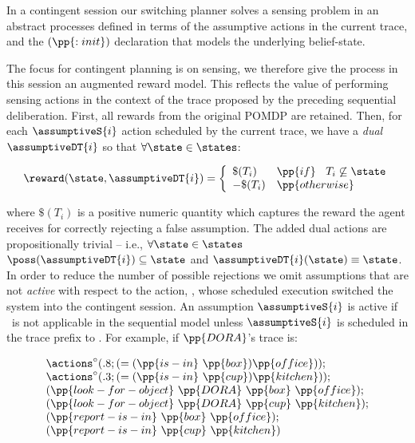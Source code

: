 In a contingent session our switching planner solves a sensing problem
in an abstract processes defined in terms of the assumptive actions in
the current trace, and the $(\pp{:init})$ declaration that models the
underlying belief-state.

The focus for contingent planning is on sensing, we therefore give the
process in this session an augmented reward model.  This reflects the
value of performing sensing actions in the context of the trace
proposed by the preceding sequential deliberation. First, all rewards
from the original POMDP are retained. Then, for each $\assumptiveS{i}$
action scheduled by the current trace, we have a {\em dual}
$\assumptiveDT{i}$ so that $\forall\state\in\states$:

\[
\reward(\state, \assumptiveDT{i}) = \bigg\{ \begin{array}{ll}
\$(T_i) & \pp{if}~\;\;T_i \not\subseteq \state \\
-\$(T_i) & \pp{otherwise} \\
\end{array}
\]

\noindent where $\$(T_i)$ is a positive numeric quantity which
captures the reward the agent receives for correctly rejecting a
false assumption. The added dual actions are propositionally trivial
-- i.e., $\forall\state\in\states$ $\poss(\assumptiveDT{i})
\subseteq \state$ and $\assumptiveDT{i}(\state) \equiv \state$.  
In order to reduce the number of possible rejections we omit
assumptions that are not {\em active} with respect to the action,
\switchAction, whose scheduled execution switched the system into
the contingent session. An assumption $\assumptiveS{i}$ is active if
\switchAction\ is not applicable in the sequential model unless
$\assumptiveS{i}$ is scheduled in the trace prefix
to \switchAction. For example, if $\pp{DORA}$'s trace is:

\[
\begin{array}{l}
\actions^{\circ}(.8;(=(\pp{is-in}~\pp{box})\pp{office}));\\
\actions^{\circ}(.3;(=(\pp{is-in}~\pp{cup})\pp{kitchen}));\\
(\pp{look-for-object}~\pp{DORA}~\pp{box}~\pp{office});\\
(\pp{look-for-object}~\pp{DORA}~\pp{cup}~\pp{kitchen});\\
(\pp{report-is-in}~\pp{box}~\pp{office}); \\
(\pp{report-is-in}~\pp{cup}~\pp{kitchen})
\end{array}
\]

